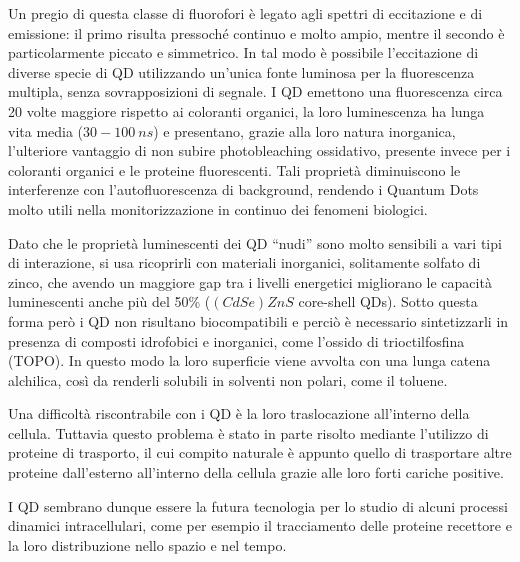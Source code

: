 Un pregio di questa classe di fluorofori è legato agli spettri di eccitazione e di emissione: il primo risulta pressoché continuo e molto ampio, mentre il secondo è particolarmente piccato e simmetrico. 
In tal modo è possibile l'eccitazione di diverse specie di QD utilizzando un'unica fonte luminosa per la fluorescenza multipla, senza sovrapposizioni di segnale.
I QD emettono una fluorescenza circa 20 volte maggiore rispetto ai coloranti organici, la loro luminescenza ha lunga vita media ($30-100\ ns$) e presentano, grazie alla loro natura inorganica, l'ulteriore vantaggio di non subire photobleaching ossidativo, presente invece per i coloranti organici e le proteine fluorescenti. 
Tali proprietà diminuiscono le interferenze con l'autofluorescenza di background, rendendo i Quantum Dots molto utili nella monitorizzazione in continuo dei fenomeni biologici. 

Dato che le proprietà luminescenti dei QD ``nudi'' sono molto sensibili a vari tipi di interazione, si usa ricoprirli con materiali inorganici, solitamente solfato di zinco, che avendo un maggiore gap tra i livelli energetici migliorano le capacità luminescenti anche più del 50\% ($(CdSe)ZnS$ core-shell QDs).
Sotto questa forma però i QD non risultano biocompatibili e perciò è necessario sintetizzarli in presenza di composti idrofobici e inorganici, come l'ossido di trioctilfosfina (TOPO). 
In questo modo la loro superficie viene avvolta con una lunga catena alchilica, così da renderli solubili in solventi non polari, come il toluene. 

Una difficoltà riscontrabile con i QD è la loro traslocazione all'interno della cellula. 
Tuttavia questo problema è stato in parte risolto mediante l'utilizzo di proteine di trasporto, il cui compito naturale è appunto quello di trasportare altre proteine dall'esterno all'interno della cellula grazie alle loro forti cariche positive.

I QD sembrano dunque essere la futura tecnologia per lo studio di alcuni processi dinamici intracellulari, come per esempio il tracciamento delle proteine recettore e la loro distribuzione nello spazio e nel tempo.
